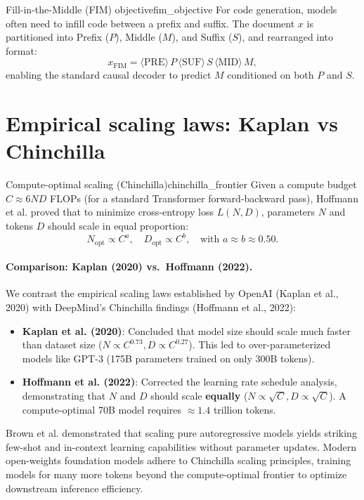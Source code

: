 \documentclass[../../main.tex]{subfiles}
\begin{document}
\begin{definition}{Fill-in-the-Middle (FIM) objective}{fim_objective}
For code generation, models often need to infill code between a prefix and suffix. The document $x$ is partitioned into Prefix ($P$), Middle ($M$), and Suffix ($S$), and rearranged into format:
\begin{equation}
x_{\text{FIM}} = \langle\text{PRE}\rangle \, P \, \langle\text{SUF}\rangle \, S \, \langle\text{MID}\rangle \, M,
\end{equation}
enabling the standard causal decoder to predict $M$ conditioned on both $P$ and $S$.
\end{definition}

\section{Empirical scaling laws: Kaplan vs Chinchilla}
\begin{theorem}{Compute-optimal scaling (Chinchilla)}{chinchilla_frontier}
Given a compute budget $C \approx 6 N D$ FLOPs (for a standard Transformer forward-backward pass), Hoffmann et al. \citep{hoffmann2022} proved that to minimize cross-entropy loss $L(N, D)$, parameters $N$ and tokens $D$ should scale in equal proportion:
\begin{equation}
\label{eq:chinchilla_opt}
N_{\text{opt}} \propto C^{a}, \quad D_{\text{opt}} \propto C^{b}, \quad \text{with } a \approx b \approx 0.50.
\end{equation}
\end{theorem}

\paragraph{Comparison: Kaplan (2020) vs.~Hoffmann (2022).}
We contrast the empirical scaling laws established by OpenAI (Kaplan et al., 2020) with DeepMind's Chinchilla findings (Hoffmann et al., 2022):
\begin{itemize}
    \item \textbf{Kaplan et al. (2020)}: Concluded that model size should scale much faster than dataset size ($N \propto C^{0.73}, D \propto C^{0.27}$). This led to over-parameterized models like GPT-3 (175B parameters trained on only 300B tokens).
    \item \textbf{Hoffmann et al. (2022)}: Corrected the learning rate schedule analysis, demonstrating that $N$ and $D$ should scale \textbf{equally} ($N \propto \sqrt{C}, D \propto \sqrt{C}$). A compute-optimal 70B model requires $\approx 1.4$ trillion tokens.
\end{itemize}


\begin{deepdive}
Brown et al. \citep{brown2020} demonstrated that scaling pure autoregressive models yields striking few-shot and in-context learning capabilities without parameter updates. Modern open-weights foundation models adhere to Chinchilla scaling principles, training models for many more tokens beyond the compute-optimal frontier to optimize downstream inference efficiency.
\end{deepdive}
\end{document}

